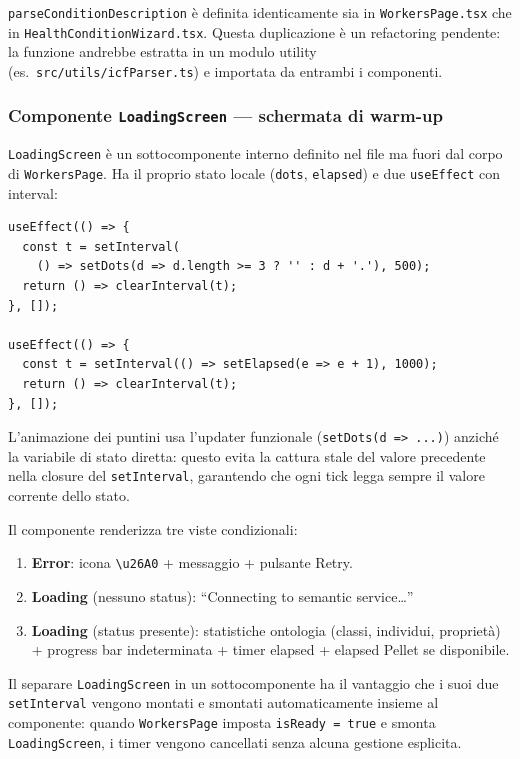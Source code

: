 \documentclass[a4paper,12pt]{article}
\begin{document}
\begin{warningbox}
\texttt{parseConditionDescription} \`{e} definita identicamente sia in
\texttt{WorkersPage.tsx} che in \texttt{HealthConditionWizard.tsx}.
Questa duplicazione \`{e} un refactoring pendente: la funzione andrebbe
estratta in un modulo utility (es.\ \texttt{src/utils/icfParser.ts})
e importata da entrambi i componenti.
\end{warningbox}

\subsubsection{Componente \texttt{LoadingScreen} --- schermata di warm-up}

\texttt{LoadingScreen} \`{e} un sottocomponente interno definito nel
file ma fuori dal corpo di \texttt{WorkersPage}. Ha il proprio stato
locale (\texttt{dots}, \texttt{elapsed}) e due \texttt{useEffect} con
interval:

\begin{lstlisting}
useEffect(() => {
  const t = setInterval(
    () => setDots(d => d.length >= 3 ? '' : d + '.'), 500);
  return () => clearInterval(t);
}, []);

useEffect(() => {
  const t = setInterval(() => setElapsed(e => e + 1), 1000);
  return () => clearInterval(t);
}, []);
\end{lstlisting}

\noindent L'animazione dei puntini usa l'updater funzionale
(\texttt{setDots(d => ...)}) anzich\'{e} la variabile di stato diretta:
questo evita la cattura stale del valore precedente nella closure
del \texttt{setInterval}, garantendo che ogni tick legga sempre il
valore corrente dello stato.

Il componente renderizza tre viste condizionali:
\begin{enumerate}[noitemsep]
  \item \textbf{Error}: icona \texttt{\texttt{\textbackslash u26A0}} + messaggio + pulsante Retry.
  \item \textbf{Loading} (nessuno status): ``Connecting to semantic service\ldots''
  \item \textbf{Loading} (status presente): statistiche ontologia
        (classi, individui, propriet\`{a}) + progress bar indeterminata
        + timer elapsed + elapsed Pellet se disponibile.
\end{enumerate}

Il separare \texttt{LoadingScreen} in un sottocomponente ha il vantaggio
che i suoi due \texttt{setInterval} vengono montati e smontati
automaticamente insieme al componente: quando \texttt{WorkersPage}
imposta \texttt{isReady = true} e smonta \texttt{LoadingScreen}, i
timer vengono cancellati senza alcuna gestione esplicita.
\end{document}
